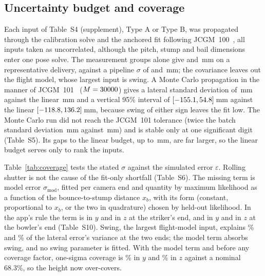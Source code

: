 \documentclass[journal]{IEEEtran}
\begin{document}
\subsection{Uncertainty budget and coverage}
\label{sec:coverage}

\begin{table}[t]
\centering
\caption{Share (\%) of simulated errors within the stated half-widths. Rows 2 and 3: the \CovBFitted{} of
\CovBN{} World~B deliveries with a fit, $w_{68} = \sigma$ and $w_{95} = 1.96\sigma$. Calibrated rows: the
\CalStrikerYN{} striker's-end and \CalBowlerYN{} bowler's-end deliveries with a bounce fit
(\CalStrikerExcluded{} and \CalBowlerExcluded{} excluded), half-widths of their end's rule fitted on the
other four folds. Row 1 has no 95\% figure (--).}
\label{tab:coverage}
\scriptsize
\setlength{\tabcolsep}{2pt}

\end{table}

Each input of Table~S4 (supplement), Type A or Type B, was propagated through the calibration solve and
the anchored fit following JCGM~100~\cite{jcgm100}, all inputs taken as uncorrelated, although the pitch,
stump and bail dimensions enter one pose solve. The measurement groups alone give \BudRepMeasY{} and
\BudRepMeasZ\,mm on a representative delivery, against a pipeline $\sigma$ of \BudRepPipeSigmaY{} and
\BudRepPipeSigmaZ\,mm; the covariance leaves out the flight model, whose largest input is swing. A Monte
Carlo propagation in the manner of JCGM~101~\cite{jcgm101} ($M = 30000$) gives a lateral standard deviation
of \McUY\,mm against the linear \McUcY\,mm and a vertical 95\% interval of $[-155.1, 54.8]$\,mm against
the linear $[-118.8, 136.2]$\,mm, because swing of either sign leaves the fit low. The Monte Carlo run did not reach
the JCGM~101 tolerance (twice the batch standard deviation \McTwoSdBatch\,mm against \McTol\,mm) and is stable
only at one significant digit (Table~S5). Its gaps to the linear budget, up to \McDHighZ\,mm, are far
larger, so the linear budget serves only to rank the inputs.

Table~\ref{tab:coverage} tests the stated $\sigma$ against the simulated error $\varepsilon$. Rolling shutter is
not the cause of the fit-only shortfall (Table~S6). The missing term is model error $\sigma_\mathrm{mod}$, fitted per
camera end and quantity by maximum likelihood as a function of the bounce-to-stump distance $x_b$, with its
form (constant, proportional to $x_b$, or the two in quadrature) chosen by held-out likelihood. In the
app's rule the term is \CalStrikerYForm{} in $y$ and \CalStrikerZForm{} in $z$ at the striker's end, and
\CalBowlerYForm{} in $y$ and \CalBowlerZForm{} in $z$ at the bowler's end (Table~S10). Swing, the largest
flight-model input, explains \CalStrikerYSwingRsq\% and \CalBowlerYSwingRsq\% of the lateral error's
variance at the two ends; the model term absorbs swing, and no swing parameter is fitted. With the model term
and before any coverage factor, one-sigma coverage is \CovBFullYOne\% in $y$ and \CovBFullZOne\% in $z$
against a nominal 68.3\%, so the height now over-covers.
\end{document}
